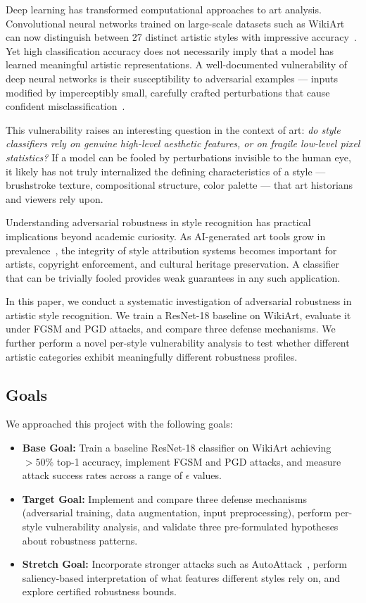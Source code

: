 \documentclass[conference]{IEEEtran}
\begin{document}
Deep learning has transformed computational approaches to art analysis. Convolutional neural networks trained on large-scale datasets such as WikiArt can now distinguish between 27 distinct artistic styles with impressive accuracy~\cite{saleh2015wikiart, tan2016artgan}. Yet high classification accuracy does not necessarily imply that a model has learned meaningful artistic representations. A well-documented vulnerability of deep neural networks is their susceptibility to adversarial examples — inputs modified by imperceptibly small, carefully crafted perturbations that cause confident misclassification~\cite{goodfellow2014fgsm, szegedy2013intriguing}.

This vulnerability raises an interesting question in the context of art: \textit{do style classifiers rely on genuine high-level aesthetic features, or on fragile low-level pixel statistics?} If a model can be fooled by perturbations invisible to the human eye, it likely has not truly internalized the defining characteristics of a style — brushstroke texture, compositional structure, color palette — that art historians and viewers rely upon.

Understanding adversarial robustness in style recognition has practical implications beyond academic curiosity. As AI-generated art tools grow in prevalence~\cite{karras2019stylegan, ramesh2022dalle}, the integrity of style attribution systems becomes important for artists, copyright enforcement, and cultural heritage preservation. A classifier that can be trivially fooled provides weak guarantees in any such application.

In this paper, we conduct a systematic investigation of adversarial robustness in artistic style recognition. We train a ResNet-18 baseline on WikiArt, evaluate it under FGSM and PGD attacks, and compare three defense mechanisms. We further perform a novel per-style vulnerability analysis to test whether different artistic categories exhibit meaningfully different robustness profiles.

\subsection{Goals}

We approached this project with the following goals:

\begin{itemize}
    \item \textbf{Base Goal:} Train a baseline ResNet-18 classifier on WikiArt achieving $>50\%$ top-1 accuracy, implement FGSM and PGD attacks, and measure attack success rates across a range of $\epsilon$ values.
    \item \textbf{Target Goal:} Implement and compare three defense mechanisms (adversarial training, data augmentation, input preprocessing), perform per-style vulnerability analysis, and validate three pre-formulated hypotheses about robustness patterns.
    \item \textbf{Stretch Goal:} Incorporate stronger attacks such as AutoAttack~\cite{croce2020autoattack}, perform saliency-based interpretation of what features different styles rely on, and explore certified robustness bounds.
\end{itemize}
\end{document}
